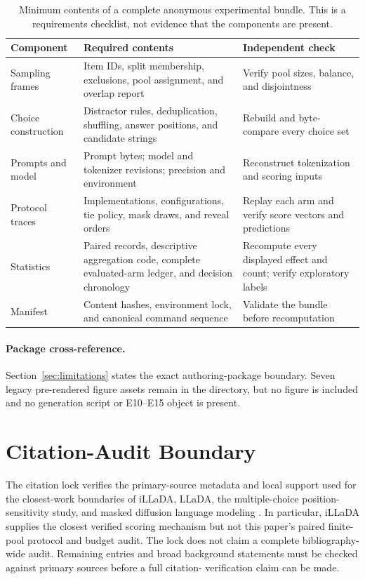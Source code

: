 \begin{table}[H]
\centering
\footnotesize
\setlength{\tabcolsep}{3.2pt}
\caption{Minimum contents of a complete anonymous experimental bundle.  This
is a requirements checklist, not evidence that the components are present.}
\label{tab:repro-checklist}
\begin{tabularx}{\textwidth}{@{}P{0.19\textwidth}YY@{}}
\toprule
Component & Required contents & Independent check \\
\midrule
Sampling frames & Item IDs, split membership, exclusions, pool assignment, and overlap report & Verify pool sizes, balance, and disjointness \\
Choice construction & Distractor rules, deduplication, shuffling, answer positions, and candidate strings & Rebuild and byte-compare every choice set \\
Prompts and model & Prompt bytes; model and tokenizer revisions; precision and environment & Reconstruct tokenization and scoring inputs \\
Protocol traces & Implementations, configurations, tie policy, mask draws, and reveal orders & Replay each arm and verify score vectors and predictions \\
Statistics & Paired records, descriptive aggregation code, complete evaluated-arm ledger, and decision chronology & Recompute every displayed effect and count; verify exploratory labels \\
Manifest & Content hashes, environment lock, and canonical command sequence & Validate the bundle before recomputation \\
\bottomrule
\end{tabularx}
\end{table}

\paragraph{Package cross-reference.}
Section~\ref{sec:limitations} states the exact authoring-package boundary.
Seven legacy pre-rendered figure assets remain in the directory, but no figure
is included and no generation script or E10--E15 object is present.

\section{Citation-Audit Boundary}
\label{app:citation-boundary}

The citation lock verifies the primary-source metadata and local support used
for the closest-work boundaries of iLLaDA, LLaDA, the multiple-choice
position-sensitivity study, and masked diffusion language modeling
\citep{nie2026illada,nie2025llada,zheng2024selection,sahoo2024mdlm}.  In
particular, iLLaDA supplies the closest verified scoring mechanism but not this
paper's paired finite-pool protocol and budget audit.  The lock does not claim
a complete bibliography-wide audit.  Remaining entries and broad background
statements must be checked against primary sources before a full citation-
verification claim can be made.
